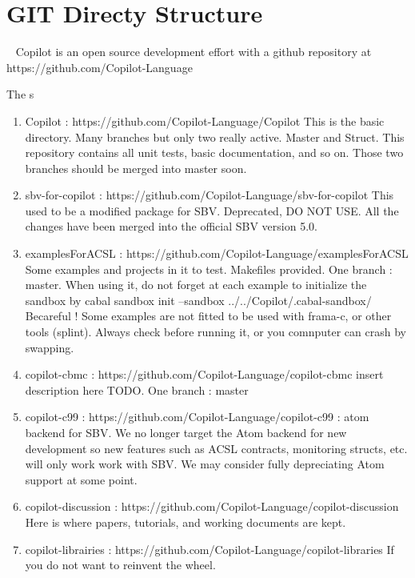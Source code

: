 \section{GIT Directy Structure}~\label{sec:GIT}
Copilot is an open source development effort with a github repository at
https://github.com/Copilot-Language

The s
\begin{enumerate}
\item Copilot : https://github.com/Copilot-Language/Copilot   This is the basic directory. Many branches but only two really active. Master and Struct. This repository contains all unit tests, basic documentation, and so on. Those two branches should be merged into master soon.
\item sbv-for-copilot : https://github.com/Copilot-Language/sbv-for-copilot This used to be a modified package for SBV. Deprecated, DO NOT USE. All the changes have been merged into the official SBV version 5.0.
\item examplesForACSL : https://github.com/Copilot-Language/examplesForACSL  Some examples and projects in it to test. Makefiles provided. One branch : master. When using it, do not forget at each example to initialize the sandbox by cabal sandbox init --sandbox ../../Copilot/.cabal-sandbox/ 
\subitem Becareful ! Some examples are not fitted to be used with frama-c, or other tools (splint). Always check before running it, or you comnputer can crash by swapping.
\item copilot-cbmc : https://github.com/Copilot-Language/copilot-cbmc  insert description here TODO. One branch : master
\item copilot-c99 : https://github.com/Copilot-Language/copilot-c99 : atom backend for SBV.  We no longer target the Atom backend for new development so new features such as ACSL contracts, monitoring structs, etc. will only work work with SBV. We may consider fully depreciating Atom support at some point. 
\item copilot-discussion : https://github.com/Copilot-Language/copilot-discussion Here is where papers, tutorials, and working documents are kept. 
\item copilot-librairies : https://github.com/Copilot-Language/copilot-libraries  If you do not want to reinvent the wheel. 

\end{enumerate}

